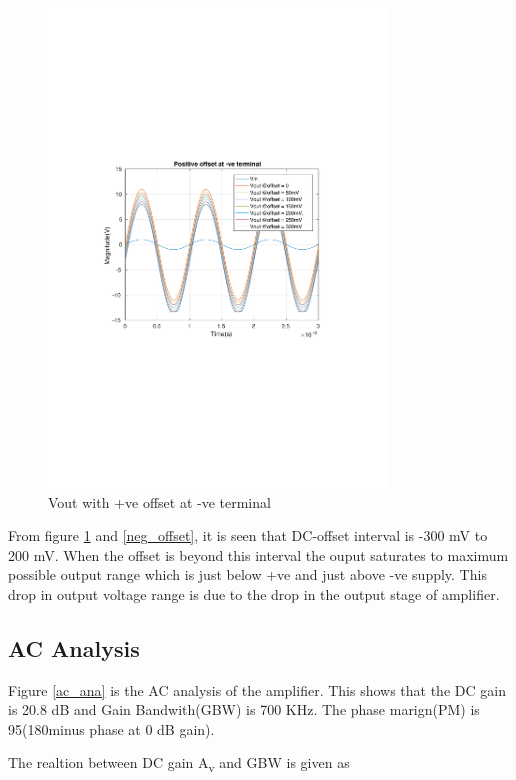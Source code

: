 \documentclass[12pt,a4paper,UKenglish]{article}
\begin{document}
\begin{figure} [H]
  \centering 
  \includegraphics[width=0.8\textwidth]{img/1a_offset_pos.pdf} 
  \caption{Vout with +ve offset at -ve terminal}
  \label{pos_offset} 
\end{figure}

From figure \ref{pos_offset} and \ref{neg_offset}, it is seen that DC-offset interval is -300 mV to 200 mV. When the offset is beyond this interval the ouput saturates to maximum possible output range which is just below +ve and just above -ve supply. This drop in output voltage range is due to the drop in the output stage of amplifier. \\

\subsection{AC Analysis}
Figure   \ref{ac_ana}  is the AC analysis of the amplifier. This shows that the DC gain is 20.8 dB and Gain Bandwith(GBW) is 700 KHz. The phase marign(PM) is 95\textdegree (180\textdegree minus phase at 0 dB gain). 

The realtion between DC gain A\textsubscript{v} and GBW is given as 
\end{document}
